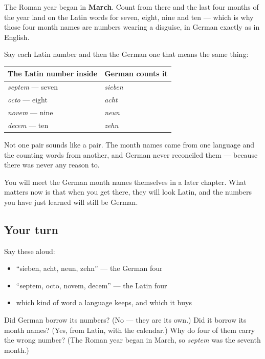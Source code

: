 \begin{culture}
The Roman year began in \textbf{March}. Count from there and the last four months of the year land on the Latin words for seven, eight, nine and ten — which is why those four month names are numbers wearing a disguise, in German exactly as in English.

Say each Latin number and then the German one that means the same thing:

\noindent
\begin{tabularx}{\linewidth}{@{}>{\raggedright\arraybackslash}X>{\raggedright\arraybackslash}X@{}}
\toprule
\textbf{The Latin number inside} & \textbf{German counts it} \\
\midrule
\emph{septem} — seven & \emph{sieben} \\
\emph{octo} — eight & \emph{acht} \\
\emph{novem} — nine & \emph{neun} \\
\emph{decem} — ten & \emph{zehn} \\
\bottomrule
\end{tabularx}

Not one pair sounds like a pair. The month names came from one language and the counting words from another, and German never reconciled them — because there was never any reason to.

You will meet the German month names themselves in a later chapter. What matters now is that when you get there, they will look Latin, and the numbers you have just learned will still be German.
\end{culture}

\subsection*{Your turn}
Say these aloud:

\begin{itemize}
\raggedright
  \item \textquotedblleft{}sieben, acht, neun, zehn\textquotedblright{} — the German four
  \item \textquotedblleft{}septem, octo, novem, decem\textquotedblright{} — the Latin four
  \item which kind of word a language keeps, and which it buys
\end{itemize}

\begin{tcolorbox}[breakable,colback=teal!4,colframe=teal!35!black,title={Before you move on}]
Did German borrow its numbers? (No — they are its own.) Did it borrow its month names? (Yes, from Latin, with the calendar.) Why do four of them carry the wrong number? (The Roman year began in March, so \emph{septem} was the seventh month.)
\end{tcolorbox}

